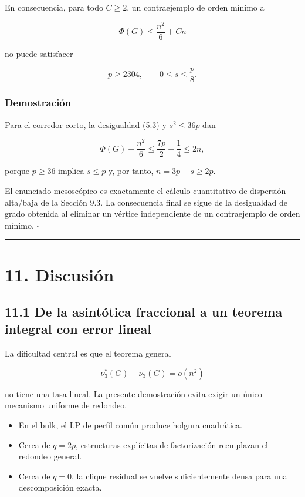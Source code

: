 \documentclass[
  11pt,
]{article}
\providecommand{\tightlist}{%
  \setlength{\itemsep}{0pt}\setlength{\parskip}{0pt}}
\begin{document}
En consecuencia, para todo \(C\ge2\), un contraejemplo de orden mínimo a

\[
\Phi(G)\le\frac{n^2}{6}+Cn
\]

no puede satisfacer

\[
p\ge2304,
\qquad
0\le s\le\frac p8.
\]

\subsubsection{Demostración}\label{demostraciuxf3n-6}

Para el corredor corto, la desigualdad (5.3) y \(s^2\le36p\) dan

\[
\Phi(G)-\frac{n^2}{6}
\le
\frac{7p}{2}+\frac14
\le
2n,
\]

porque \(p\ge36\) implica \(s\le p\) y, por tanto, \(n=3p-s\ge2p\).

El enunciado mesoscópico es exactamente el cálculo cuantitativo de
dispersión alta/baja de la Sección 9.3. La consecuencia final se sigue
de la desigualdad de grado obtenida al eliminar un vértice independiente
de un contraejemplo de orden mínimo. \(\square\)

\begin{center}\rule{0.5\linewidth}{0.5pt}\end{center}

\section{11. Discusión}\label{discusiuxf3n}

\subsection{11.1 De la asintótica fraccional a un teorema integral con
error
lineal}\label{de-la-asintuxf3tica-fraccional-a-un-teorema-integral-con-error-lineal}

La dificultad central es que el teorema general

\[
\nu_3^*(G)-\nu_3(G)=o(n^2)
\]

no tiene una tasa lineal. La presente demostración evita exigir un único
mecanismo uniforme de redondeo.

\begin{itemize}
\tightlist
\item
  En el bulk, el LP de perfil común produce holgura cuadrática.
\item
  Cerca de \(q=2p\), estructuras explícitas de factorización reemplazan
  el redondeo general.
\item
  Cerca de \(q=0\), la clique residual se vuelve suficientemente densa
  para una descomposición exacta.
\end{itemize}
\end{document}

